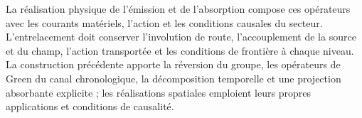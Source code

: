 La réalisation physique de l'émission et de l'absorption compose ces opérateurs avec les courants matériels, l'action et les conditions causales du secteur. L'entrelacement doit conserver l'involution de route, l'accouplement de la source et du champ, l'action transportée et les conditions de frontière à chaque niveau. La construction précédente apporte la réversion du groupe, les opérateurs de Green du canal chronologique, la décomposition temporelle et une projection absorbante explicite ; les réalisations spatiales emploient leurs propres applications et conditions de causalité.
